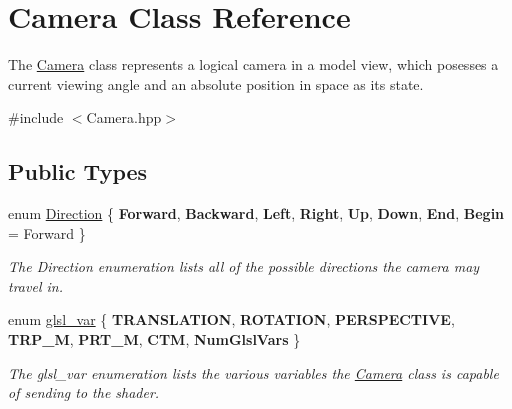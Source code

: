 \hypertarget{class_camera}{\section{\-Camera \-Class \-Reference}
\label{class_camera}
}


\-The \hyperlink{class_camera}{\-Camera} class represents a logical camera in a model view, which posesses a current viewing angle and an absolute position in space as its state.  




{\ttfamily \#include $<$\-Camera.\-hpp$>$}

\subsection*{\-Public \-Types}
\begin{DoxyCompactItemize}
\item 
enum \hyperlink{class_camera_a80cb65605322d27ad3b6d973484509ec}{\-Direction} \{ \*
{\bfseries \-Forward}, 
{\bfseries \-Backward}, 
{\bfseries \-Left}, 
{\bfseries \-Right}, 
\*
{\bfseries \-Up}, 
{\bfseries \-Down}, 
{\bfseries \-End}, 
{\bfseries \-Begin} =  \-Forward
 \}
\begin{DoxyCompactList}\small\item\em \-The \-Direction enumeration lists all of the possible directions the camera may travel in. \end{DoxyCompactList}\item 
enum \hyperlink{class_camera_a6ff726a75a430e4f17e5dec42e4d4405}{glsl\-\_\-var} \{ \*
{\bfseries \-T\-R\-A\-N\-S\-L\-A\-T\-I\-O\-N}, 
{\bfseries \-R\-O\-T\-A\-T\-I\-O\-N}, 
{\bfseries \-P\-E\-R\-S\-P\-E\-C\-T\-I\-V\-E}, 
{\bfseries \-T\-R\-P\-\_\-\-M}, 
\*
{\bfseries \-P\-R\-T\-\_\-\-M}, 
{\bfseries \-C\-T\-M}, 
{\bfseries \-Num\-Glsl\-Vars}
 \}
\begin{DoxyCompactList}\small\item\em \-The glsl\-\_\-var enumeration lists the various variables the \hyperlink{class_camera}{\-Camera} class is capable of sending to the shader. \end{DoxyCompactList}\end{DoxyCompactItemize}
